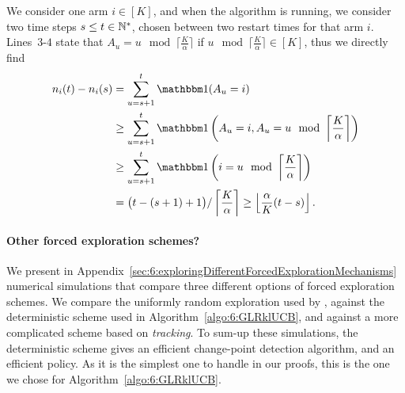 \begin{smallproof}
    We consider one arm $i\in[K]$, and when the \GLRklUCB{} algorithm is running,
    we consider two time steps $s\leq t\in\mathbb{N}^*$, chosen between two restart times for that arm $i$.
    Lines~$3$-$4$ state that $A_u = u \mod \lceil \frac{K}{\alpha} \rceil$
    if $u \mod \lceil \frac{K}{\alpha} \rceil \in [K]$,
    thus we directly find
    \begin{align*}
        n_i(t) - n_i(s)
        & = \sum_{u=s+1}^{t} \indic(A_u = i) \\
        & \geq \sum_{u=s+1}^{t} \indic\left(A_u = i, A_u = u \mod \left\lceil \frac{K}{\alpha} \right\rceil\right) \\
        & \geq \sum_{u=s+1}^{t} \indic\left(i = u \mod \left\lceil \frac{K}{\alpha} \right\rceil\right) \\
        & = \bigl(t - (s+1) + 1\bigr) / \left\lceil \frac{K}{\alpha} \right\rceil
        \geq \left\lfloor \frac{\alpha}{K} (t - s) \right\rfloor.
    \end{align*}
\end{smallproof}


\paragraph{Other forced exploration schemes?}
%
We present in Appendix~\ref{sec:6:exploringDifferentForcedExplorationMechanisms} numerical simulations that compare three different options of forced exploration schemes.
We compare the uniformly random exploration used by \CUSUMUCB, against the deterministic scheme used in Algorithm~\ref{algo:6:GLRklUCB}, and against a more complicated scheme based on \emph{tracking}.
To sum-up these simulations, the deterministic scheme gives an efficient change-point detection algorithm, and an efficient \GLRklUCB{} policy.
As it is the simplest one to handle in our proofs, this is the one we chose for Algorithm~\ref{algo:6:GLRklUCB}.



